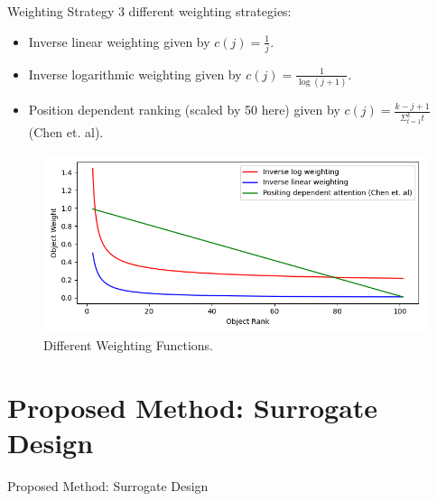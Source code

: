 \documentclass{beamer}
\begin{document}
\begin{frame}[t]{Weighting Strategy}
3 different weighting strategies:
\begin{itemize}
\item Inverse linear weighting given by $c(j) = \frac{1}{j}$.
\item Inverse logarithmic weighting given by $c(j) = \frac{1}{\log (j+1)}$.
\item Position dependent ranking (scaled by 50 here) given by $c(j) = \frac{k - j + 1}{\Sigma_{t=1}^k t}$ (Chen et. al).
\end{itemize}

\begin{figure}[htb]
  \centering
    \includegraphics[scale=0.3]{images/weightingfunctions}
    \caption{Different Weighting Functions.}
    \label{fig:weightingfunctions}
\end{figure}

\end{frame}





\section{Proposed Method: Surrogate Design}

\begin{frame}

\centering
\LARGE{Proposed Method: Surrogate Design}

\end{frame}
\end{document}
